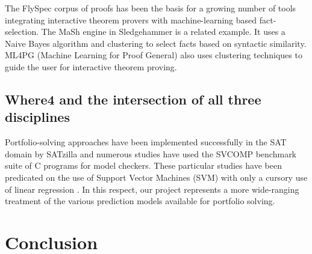 The FlySpec \cite{Flyspec} corpus of proofs has been the basis for a growing number of tools integrating interactive theorem provers with machine-learning based fact-selection. The MaSh engine in Sledgehammer \cite{Sledgehammer} is a related example. It uses a Naive Bayes algorithm and clustering to select facts based on syntactic similarity. ML4PG (Machine Learning for Proof General) \cite{ML4PG} also uses clustering techniques to guide the user for interactive theorem proving.

\subsection{Where4 and the intersection of all three disciplines}
\label{sub:lrsvmmml}

Portfolio-solving approaches have been implemented successfully in the SAT domain by SATzilla \cite{Satzilla} and numerous studies \cite{MUX} \cite{DPVZ15:CAV} have used the SVCOMP \cite{SVCOMP} benchmark suite of C programs for model checkers. These particular studies have been predicated on the use of Support Vector Machines (SVM) with only a cursory use of linear regression \cite{MUX}. In this respect, our project represents a more wide-ranging treatment of the various prediction models available for portfolio solving.

\section{Conclusion}
